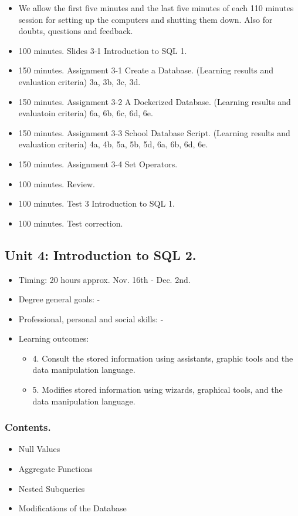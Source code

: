 \documentclass[catalan, a4paper, 12pt, titlepage]{article}
\begin{document}
  \begin{itemize}
          \item We allow the first five minutes and the last five minutes of each 110 minutes session for setting up the computers and shutting them down. Also for doubts, questions and feedback.
	  \item 100 minutes. Slides 3-1 Introduction to SQL 1.
	  \item 150 minutes. Assignment 3-1 Create a Database. (\faGraduationCap Learning results and evaluation criteria) 3a, 3b, 3c, 3d.
	  \item 150 minutes. Assignment 3-2 A Dockerized Database. (\faGraduationCap Learning results and evaluatoin criteria) 6a, 6b, 6c, 6d, 6e.
	  \item 150 minutes. Assignment 3-3 School Database Script. (\faGraduationCap Learning results and evaluation criteria) 4a, 4b, 5a, 5b, 5d, 6a, 6b, 6d, 6e.
	  \item 150 minutes. Assignment 3-4 Set Operators.
	  \item 100 minutes. Review.
	  \item 100 minutes. Test 3 Introduction to SQL 1.
	  \item 100 minutes. Test correction.
  \end{itemize}

  \subsection{Unit 4: Introduction to SQL 2.}

  \begin{itemize}
	\item Timing: 20 hours approx. Nov. 16th - Dec. 2nd.
	\item Degree general goals: -
	\item Professional, personal and social skills: -
	\item Learning outcomes: 
		\begin{itemize}
			\item 4. Consult the stored information using assistants, graphic tools and the data manipulation language.
			\item 5. Modifies stored information using wizards, graphical tools, and the data manipulation language.
		\end{itemize}
  \end{itemize}

  \subsubsection{Contents.}
  \begin{itemize}
	  \item Null Values
	  \item Aggregate Functions 
	  \item Nested Subqueries
	  \item Modifications of the Database
  \end{itemize}
  
\end{document}
